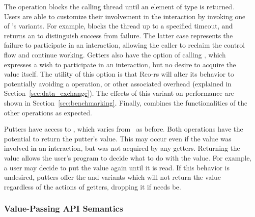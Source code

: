 The  operation blocks the calling thread until an element of type  is returned. Users are able to customize their involvement in the interaction by invoking one of 's variants. For example,  blocks the thread up to a specified timeout, and returns an  to distinguish success from failure. The latter case represents the failure to participate in an interaction, allowing the caller to reclaim the control flow and continue working. Getters also have the option of calling , which expresses a wish to participate in an interaction, but no desire to acquire the value itself. The utility of this option is that Reo-rs will alter its behavior to potentially avoiding a  operation, or other associated overhead (explained in Section~\ref{sec:data_exchange}). The effects of this variant on performance are shown in Section~\ref{sec:benchmarking}. Finally,  combines the functionalities of the other operations as expected.

Putters have access to , which varies from~ as before. Both operations have the potential to return the putter's value. This may occur even if the value was involved in an interaction, but was not acquired by any getters. Returning the value allows the user's program to decide what to do with the value. For example, a user may decide to put the value again until it is read. If this behavior is undesired, putters offer the  and  variants which will not return the value regardless of the actions of getters, dropping it if needs be.

\subsubsection{Value-Passing API Semantics}



